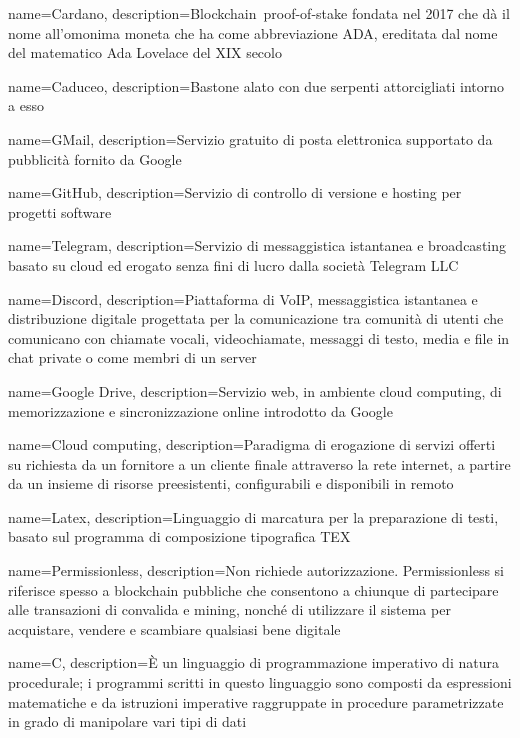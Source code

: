 {
	name={Cardano},
	description={Blockchain\glo\ proof-of-stake fondata nel 2017 che dà il nome all’omonima moneta che ha come abbreviazione ADA, ereditata dal nome del matematico Ada Lovelace del XIX secolo}
}

{
	name={Caduceo},
	description={Bastone alato con due serpenti attorcigliati intorno a esso}
}

{
	name={GMail},
	description={Servizio gratuito di posta elettronica supportato da pubblicità fornito da Google}
}

{
	name={GitHub},
	description={Servizio di controllo di versione e hosting per progetti software}
}

{
	name={Telegram},
	description={Servizio di messaggistica istantanea e broadcasting basato su cloud ed erogato senza fini di lucro dalla società Telegram LLC}
}

{
	name={Discord},
	description={Piattaforma di VoIP, messaggistica istantanea e distribuzione digitale progettata per la comunicazione tra comunità di utenti che comunicano con chiamate vocali, videochiamate, messaggi di testo, media e file in chat private o come membri di un server}
}

{
	name={Google Drive},
	description={Servizio web, in ambiente cloud computing\glo, di memorizzazione e sincronizzazione online introdotto da Google}
}

{
	name={Cloud computing},
	description={Paradigma di erogazione di servizi offerti su richiesta da un fornitore a un cliente finale attraverso la rete internet, a partire da un insieme di risorse preesistenti, configurabili e disponibili in remoto}
}

{
	name={Latex},
	description={Linguaggio di marcatura per la preparazione di testi, basato sul programma di composizione tipografica TEX}
}

{
	name={Permissionless},
	description={Non richiede autorizzazione. Permissionless si riferisce spesso a blockchain pubbliche che consentono a chiunque di partecipare alle transazioni di convalida e mining, nonché di utilizzare il sistema per acquistare, vendere e scambiare qualsiasi bene digitale}
}

{
	name={C},
	description={È un linguaggio di programmazione imperativo di natura procedurale; i programmi scritti in questo linguaggio sono composti da espressioni matematiche e da istruzioni imperative raggruppate in procedure parametrizzate in grado di manipolare vari tipi di dati}
}

